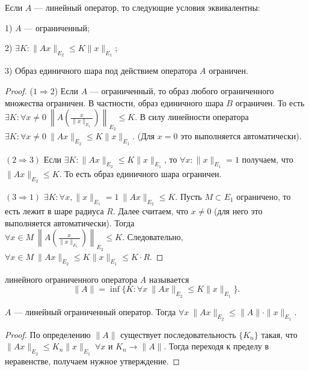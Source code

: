 \begin{statement}
\label{equiv-bounded-oper}
Если $A$ --- линейный оператор, то следующие условия эквивалентны:

1) $A$ --- ограниченный;

2) $\exists K : \|Ax\|_{E_2} \leqslant K \|x\|_{E_1}$;

3) Образ единичного шара под действием оператора $A$ ограничен.
\end{statement}

\begin{proof}

($1 \Rightarrow 2$) Если $A$ --- ограниченный, то образ любого ограниченного множества ограничен. В частности, образ единичного шара $B$ ограничен.
То есть $\exists K : \forall x \neq 0\ 
\left\| A \left( \frac{x}{\|x\|_{E_1}} \right) \right\|_{E_2} \leqslant K$.
В силу линейности оператора $\exists K : \forall x \neq 0\ \|Ax\|_{E_2} \leqslant K \|x\|_{E_1}$.
(Для $x = 0$ это выполняется автоматически).

$(2 \Rightarrow 3)$
Если $\exists K : \|Ax\|_{E_2} \leqslant K \|x\|_{E_1}$, то $\forall x : \|x\|_{E_1} = 1$ получаем, что
$\|Ax\|_{E_2} \leqslant K$. То есть образ единичного шара ограничен.

$(3 \Rightarrow 1)$
$\exists K : \forall x, \|x\|_{E_1} = 1 \ \|Ax\|_{E_2} \leqslant K$. Пусть $M \subset E_1$ ограничено, то есть лежит в шаре радиуса $R$. Далее считаем, что $x \neq 0$ (для него это выполняется автоматически).
Тогда \\
$\forall x \in M\ \left\| A \left( \frac{x}{\|x\|_{E_1}} \right) \right\|_{E_2} \leqslant K$.
Следовательно, $\forall x \in M\ \|Ax\|_{E_2} \leqslant K \|x\|_{E_1} \leqslant K \cdot R$.
\end{proof}

\begin{definition}
 линейного ограниченного оператора $A$ называется 
$$\|A\| = \inf \{K : \forall x \ \|Ax\|_{E_2} \leqslant K \|x\|_{E_1} \}.$$
\end{definition}

\begin{statement}
$A$ --- линейный ограниченный оператор. Тогда
$\forall x \ \|Ax\|_{E_2} \leqslant \|A\| \cdot \|x\|_{E_1}$.
\end{statement}

\begin{proof}
По определению $\|A\|$ существует последовательность $\{K_n\}$ такая, что
$\|Ax\|_{E_2} \leqslant K_n \|x\|_{E_1} \ \forall x$ и $K_n \to \|A\|$. Тогда переходя к пределу в неравенстве, получаем нужное утверждение.
\end{proof}

